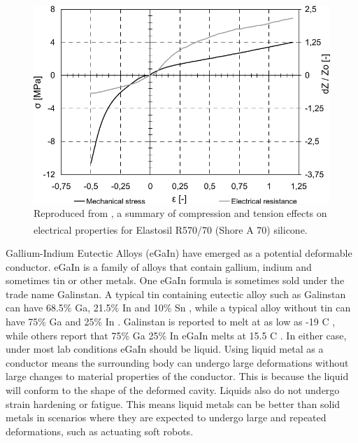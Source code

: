 \documentclass[a4paper,12pt]{article}
\begin{document}
\begin{figure}[h!]
    \centering
    \includegraphics[width=\textwidth]{valentaConductiveRubber.png}
    \caption{Reproduced from \cite{valentaMechanicalElectricalTesting2008}, a summary of compression and tension effects on electrical properties for Elastosil\textsuperscript{\tiny\textregistered} R570/70 (Shore A 70) silicone.}
    \label{fg:conductiveRubber}
\end{figure}

Gallium-Indium Eutectic Alloys (eGaIn) have emerged as a potential deformable conductor. eGaIn is a family of alloys that contain gallium, indium and sometimes tin or other metals. One eGaIn formula is sometimes sold under the trade name Galinstan. A typical tin containing eutectic alloy such as Galinstan can have 68.5\% Ga, 21.5\% In and 10\% Sn \cite{liuCharacterizationNontoxicLiquidMetal2012}, while a typical alloy without tin can have 75\% Ga and 25\% In \cite{dickeyEutecticGalliumIndiumEGaIn2008}. Galinstan is reported to melt at as low as -19 \degree C \cite{surmannVoltammetricAnalysisUsing2005}, while others report that 75\% Ga 25\% In eGaIn melts at 15.5 \degree C \cite{dickeyEutecticGalliumIndiumEGaIn2008}. In either case, under most lab conditions eGaIn should be liquid.
Using liquid metal as a conductor means the surrounding body can undergo large deformations without large changes to material properties of the conductor. This is because the liquid will conform to the shape of the deformed cavity. Liquids also do not undergo strain hardening or fatigue. This means liquid metals can be better than solid metals in scenarios where they are expected to undergo large and repeated deformations, such as actuating soft robots.
\end{document}
